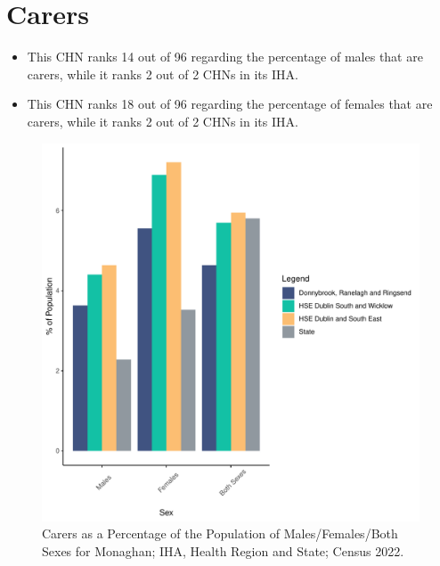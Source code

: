 \documentclass{article}
\begin{document}
\section{Carers}\label{sect:Carers}
\begin{itemize}
\item This CHN ranks  14 out of 96 regarding the percentage of males that are carers, while it ranks   2 out of 2 CHNs in its IHA.
\item This CHN ranks  18 out of 96 regarding the percentage of females that are carers, while it ranks   2 out of 2 CHNs in its IHA.
\end{itemize}
\begin{figure}[H]
	\centering
	\includegraphics[width = 150mm]{../figures/CareED.pdf}
	\caption{Carers as a Percentage of the Population of Males/Females/Both Sexes for Monaghan; IHA, Health Region and State; Census 2022.}
	\label{fig:2ae19629-1a6a-13a3-e055-000000000001}
	\end{figure}
\end{document}
